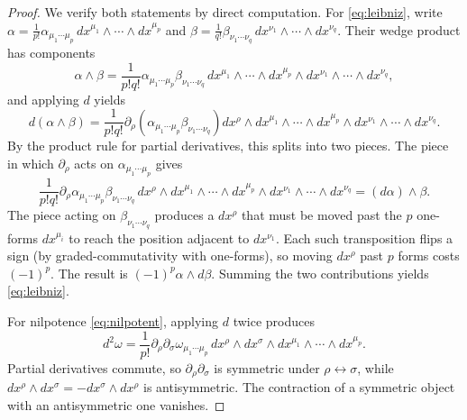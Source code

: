 \documentclass[11pt]{article}
\theoremstyle{definition}
\numberwithin{theorem}{section}
\numberwithin{equation}{section}
\let\del\partial
\begin{document}
\begin{proof}
We verify both statements by direct computation. For \eqref{eq:leibniz}, write $\alpha = \frac{1}{p!}\alpha_{\mu_1\cdots \mu_p}\, dx^{\mu_1}\wedge\cdots\wedge dx^{\mu_p}$ and $\beta = \frac{1}{q!}\beta_{\nu_1\cdots \nu_q}\,dx^{\nu_1}\wedge\cdots\wedge dx^{\nu_q}$. Their wedge product has components
\begin{equation*}
\alpha\wedge\beta = \frac{1}{p!q!}\alpha_{\mu_1\cdots\mu_p}\beta_{\nu_1\cdots\nu_q}\, dx^{\mu_1}\wedge\cdots\wedge dx^{\mu_p}\wedge dx^{\nu_1}\wedge\cdots\wedge dx^{\nu_q},
\end{equation*}
and applying $d$ yields
\begin{equation*}
d(\alpha\wedge\beta) = \frac{1}{p!q!}\del_\rho\left(\alpha_{\mu_1\cdots\mu_p}\beta_{\nu_1\cdots\nu_q}\right)dx^\rho \wedge dx^{\mu_1}\wedge\cdots\wedge dx^{\mu_p}\wedge dx^{\nu_1}\wedge\cdots\wedge dx^{\nu_q}.
\end{equation*}
By the product rule for partial derivatives, this splits into two pieces. The piece in which $\del_\rho$ acts on $\alpha_{\mu_1\cdots\mu_p}$ gives
\begin{equation*}
\frac{1}{p!q!}\del_\rho \alpha_{\mu_1\cdots\mu_p}\beta_{\nu_1\cdots\nu_q}\, dx^\rho \wedge dx^{\mu_1}\wedge\cdots\wedge dx^{\mu_p}\wedge dx^{\nu_1}\wedge\cdots\wedge dx^{\nu_q} = (d\alpha)\wedge\beta.
\end{equation*}
The piece acting on $\beta_{\nu_1\cdots\nu_q}$ produces a $dx^\rho$ that must be moved past the $p$ one-forms $dx^{\mu_i}$ to reach the position adjacent to $dx^{\nu_1}$. Each such transposition flips a sign (by graded-commutativity with one-forms), so moving $dx^\rho$ past $p$ forms costs $(-1)^p$. The result is $(-1)^p\alpha\wedge d\beta$. Summing the two contributions yields \eqref{eq:leibniz}.

\medskip

\noindent For nilpotence \eqref{eq:nilpotent}, applying $d$ twice produces
\begin{equation*}
d^2\omega = \frac{1}{p!}\del_\rho \del_\sigma \omega_{\mu_1\cdots\mu_p}\, dx^\rho \wedge dx^\sigma \wedge dx^{\mu_1}\wedge\cdots\wedge dx^{\mu_p}.
\end{equation*}
Partial derivatives commute, so $\del_\rho \del_\sigma$ is symmetric under $\rho\leftrightarrow\sigma$, while $dx^\rho \wedge dx^\sigma = -dx^\sigma \wedge dx^\rho$ is antisymmetric. The contraction of a symmetric object with an antisymmetric one vanishes.
\end{proof}
\end{document}
